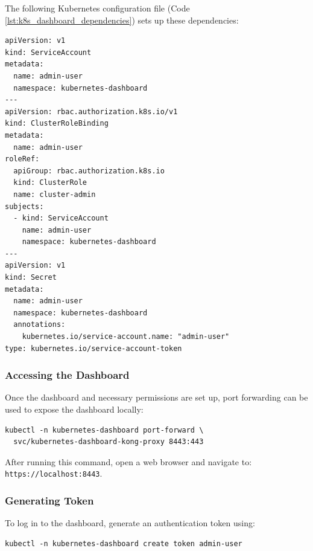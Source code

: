 The following Kubernetes configuration file (Code \ref{lst:k8s_dashboard_dependencies}) sets up these dependencies:

\begin{lstlisting}[language=Kubernetes, caption={Kubernetes Configuration for Setting Up Dashboard Dependencies}, label={lst:k8s_dashboard_dependencies}]
apiVersion: v1
kind: ServiceAccount
metadata:
  name: admin-user
  namespace: kubernetes-dashboard
---
apiVersion: rbac.authorization.k8s.io/v1
kind: ClusterRoleBinding
metadata:
  name: admin-user
roleRef:
  apiGroup: rbac.authorization.k8s.io
  kind: ClusterRole
  name: cluster-admin
subjects:
  - kind: ServiceAccount
    name: admin-user
    namespace: kubernetes-dashboard
---
apiVersion: v1
kind: Secret
metadata:
  name: admin-user
  namespace: kubernetes-dashboard
  annotations:
    kubernetes.io/service-account.name: "admin-user"
type: kubernetes.io/service-account-token
\end{lstlisting}

\subsubsection{Accessing the Dashboard}
Once the dashboard and necessary permissions are set up, port forwarding can be used to expose the dashboard locally:
\begin{verbatim}
kubectl -n kubernetes-dashboard port-forward \
  svc/kubernetes-dashboard-kong-proxy 8443:443
\end{verbatim}

After running this command, open a web browser and navigate to: \texttt{https://localhost:8443}.

\subsubsection{Generating Token}
To log in to the dashboard, generate an authentication token using:
\begin{verbatim}
kubectl -n kubernetes-dashboard create token admin-user
\end{verbatim}
